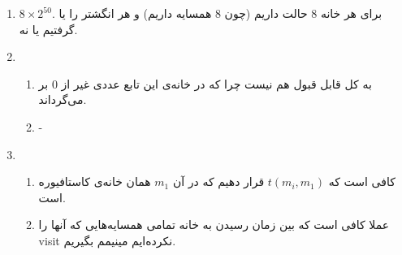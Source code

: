 \begin{enumerate}
    \item $8 \times 2^{50}$. برای هر خانه 8 حالت داریم (چون 8 همسایه داریم) و هر انگشتر را یا گرفتیم یا نه.
    \item \begin{enumerate}
        \item به کل قابل قبول هم نیست چرا که در خانه‌ی  این تابع عددی غیر از 0 بر می‌گرداند.
        \item -
    \end{enumerate}
    \item \begin{enumerate}
        \item کافی است که $t(m_i, m_1)$ قرار دهیم که در آن $m_1$ همان خانه‌ی کاستافیوره است. 
        \item عملا کافی است که بین زمان رسیدن به خانه تمامی همسایه‌هایی که آنها را visit نکرده‌‌ایم مینیمم بگیریم.
    \end{enumerate}
\end{enumerate}